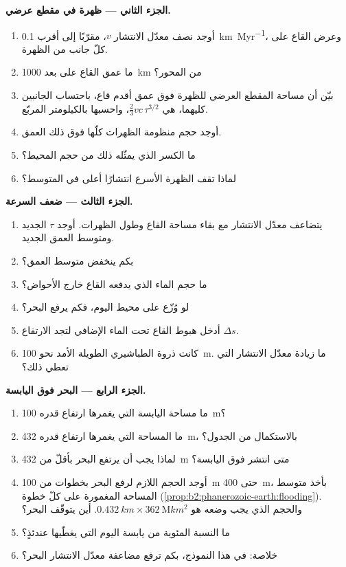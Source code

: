 \begin{problem}
\noindent\textbf{الجزء الثاني --- ظهرة في مقطع عرضي.}
\begin{enumerate}[resume]
  \item أوجد نصف معدّل الانتشار $v$، مقرّبًا إلى أقرب \qty{0.1}{km.Myr^{-1}}، وعرض
        القاع على كلّ جانب من الظهرة.
  \item ما عمق القاع على بعد \qty{1000}{km} من المحور؟
  \item بيّن أن مساحة المقطع العرضي للظهرة فوق عمق أقدم قاع، باحتساب
        الجانبين كليهما، هي $\tfrac23 v c\,\tau^{3/2}$، واحسبها
        بالكيلومتر المربّع.
  \item أوجد حجم منظومة الظهرات كلّها فوق ذلك العمق.
  \item ما الكسر الذي يمثّله ذلك من حجم المحيط؟
  \item لماذا تقف الظهرة الأسرع انتشارًا أعلى في المتوسط؟
\end{enumerate}

\noindent\textbf{الجزء الثالث --- ضعف السرعة.}
\begin{enumerate}[resume]
  \item يتضاعف معدّل الانتشار مع بقاء مساحة القاع وطول الظهرات. أوجد $\tau$ الجديد
        ومتوسط العمق الجديد.
  \item بكم ينخفض متوسط العمق؟
  \item ما حجم الماء الذي يدفعه القاع خارج الأحواض؟
  \item لو وُزّع على محيط اليوم، فكم يرفع البحر؟
  \item أدخل هبوط القاع تحت الماء الإضافي لتجد الارتفاع $\Delta s$.
  \item كانت ذروة الطباشيري الطويلة الأمد نحو \qty{100}{m}. ما زيادة معدّل الانتشار
        التي تعطي ذلك؟
\end{enumerate}

\noindent\textbf{الجزء الرابع --- البحر فوق اليابسة.}
\begin{enumerate}[resume]
  \item ما مساحة اليابسة التي يغمرها ارتفاع قدره \qty{100}{m}؟
  \item ما المساحة التي يغمرها ارتفاع قدره \qty{432}{m}، بالاستكمال من الجدول؟
  \item لماذا يجب أن يرتفع البحر بأقلّ من \qty{432}{m} متى انتشر فوق اليابسة؟
  \item أوجد الحجم اللازم لرفع البحر بخطوات من \qty{100}{m} حتى \qty{400}{m}،
        بأخذ متوسط المساحة المغمورة على كلّ خطوة (\cref{prop:b2:phanerozoic-earth:flooding}).
        والحجم الذي يجب وضعه هو $\qty{0.432}{km} \times \qty{362}{\mega km^2}$. أين
        يتوقّف البحر؟
  \item ما النسبة المئوية من يابسة اليوم التي يغطّيها عندئذٍ؟
  \item خلاصة: في هذا النموذج، بكم ترفع مضاعفة معدّل الانتشار البحر؟
\end{enumerate}
\end{problem}
